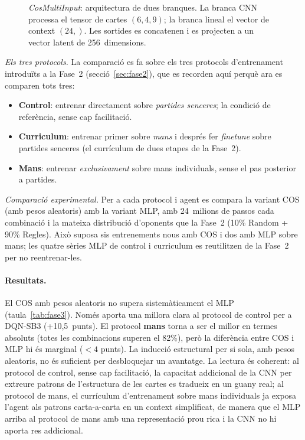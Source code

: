 \begin{figure}[H]
{%
  }
  \caption{\emph{CosMultiInput}: arquitectura de dues branques. La branca CNN processa
           el tensor de cartes $(6,4,9)$; la branca lineal el vector de context $(24,)$.
           Les sortides es concatenen i es projecten a un vector latent de 256~dimensions.}
  \label{fig:cos-multi-input}
\end{figure}

\emph{Els tres protocols.} La comparació es fa sobre els tres protocols d'entrenament
introduïts a la Fase~2 (secció~\ref{sec:fase2}), que es recorden aquí perquè ara es
comparen tots tres:
\begin{itemize}
  \item \textbf{Control}: entrenar directament sobre \emph{partides senceres}; la condició
        de referència, sense cap facilitació.
  \item \textbf{Curriculum}: entrenar primer sobre \emph{mans} i després fer \emph{finetune}
        sobre partides senceres (el currículum de dues etapes de la Fase~2).
  \item \textbf{Mans}: entrenar \emph{exclusivament} sobre mans individuals, sense el pas
        posterior a partides.
\end{itemize}

\emph{Comparació experimental.} Per a cada protocol i agent es compara la variant COS (amb
pesos aleatoris) amb la variant \ac{MLP}, amb 24~milions de passos cada combinació i la
mateixa distribució d'oponents que la Fase~2 (10\% Random + 90\% Regles). Això suposa sis
entrenements nous amb COS i dos amb \ac{MLP} sobre mans; les quatre sèries \ac{MLP} de control i
curriculum es reutilitzen de la Fase~2 per no reentrenar-les.

\paragraph{Resultats.} El COS amb pesos aleatoris no supera sistemàticament el \ac{MLP}
(taula~\ref{tab:fase3}). Només aporta una millora clara al protocol de control per a
DQN-SB3 (+10{,}5~punts). El protocol \textbf{mans} torna a ser el millor en termes
absoluts (totes les combinacions superen el 82\%), però la diferència entre COS i \ac{MLP}
hi és marginal (\(<4\) punts). La inducció estructural per si sola, amb pesos aleatoris,
no és suficient per desbloquejar un avantatge. La lectura és coherent: al protocol de
control, sense cap facilitació, la capacitat addicional de la \ac{CNN} per extreure
patrons de l'estructura de les cartes es tradueix en un guany real; al protocol de mans,
el currículum d'entrenament sobre mans individuals ja exposa l'agent als patrons
carta-a-carta en un context simplificat, de manera que el \ac{MLP} arriba al protocol
de mans amb una representació prou rica i la \ac{CNN} no hi aporta res addicional.

